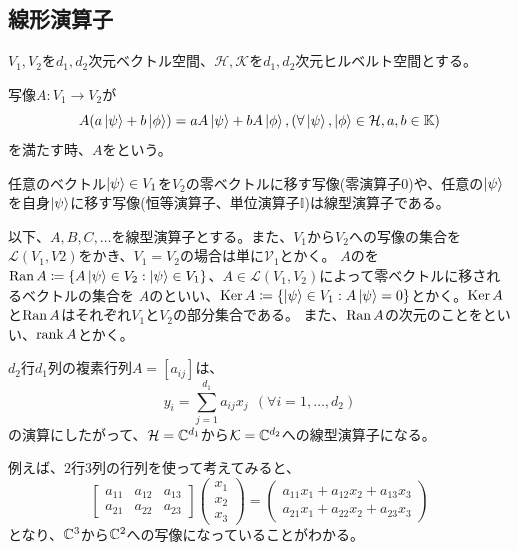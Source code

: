 \subsection{線形演算子}
$V_1,V_2$を$d_1,d_2$次元ベクトル空間、$\mathcal{H},\mathcal{K}$を$d_1,d_2$次元ヒルベルト空間とする。

\begin{Def}
  写像$A:V_1\to V_2$が
  $$
    A(a\ket{\psi} + b\ket{\phi}) = aA\ket{\psi} + bA\ket{\phi}, (\forall \ket{\psi},\ket{\phi}\in \mathcal{H},a,b \in \mathbb{K})
  $$
  を満たす時、$A$をという。
\end{Def}

任意のベクトル$\ket{\psi}\in V_1$を$V_2$の零ベクトルに移す写像(零演算子$0$)や、任意の$\ket{\psi}$を自身$\ket{\psi}$に移す写像(恒等演算子、単位演算子$\mathbb{I}$)は線型演算子である。

以下、$A,B,C,\ldots$を線型演算子とする。また、$V_1$から$V_2$への写像の集合を$\mathcal{L}(V_1,V2)$をかき、$V_1 = V_2$の場合は単に$\mathcal{V}_1$とかく。
$A$のを$\text{Ran}\,A\coloneqq\{A\ket{\psi}\in V_2 : \ket{\psi}\in V_1 \}$、$A\in \mathcal{L}(V_1,V_2)$によって零ベクトルに移されるベクトルの集合を
$A$のといい、$\text{Ker}\,A\coloneqq\{ \ket{\psi} \in V_1 : A\ket{\psi} = 0 \}$とかく。$\text{Ker}\,A$と$\text{Ran}\,A$はそれぞれ$V_1$と$V_2$の部分集合である。
また、$\text{Ran}\,A$の次元のことをといい、$\text{rank}\,A$とかく。

\begin{reidai}
  $d_2$行$d_1$列の複素行列$A = [a_{ij}]$は、
  $$
  y_i = \sum_{j=1}^{d_1} a_{ij}x_j~~(\forall i = 1,\ldots,d_2)
  $$
  の演算にしたがって、$\mathcal{H}=\mathbb{C}^{d_1}$から$\mathcal{K}=\mathbb{C}^{d_2}$への線型演算子になる。
\end{reidai}

\begin{reidai}
  例えば、$2$行$3$列の行列を使って考えてみると、
  $$
  \begin{bmatrix}
    a_{11} & a_{12} & a_{13} \\
    a_{21} & a_{22} & a_{23}
  \end{bmatrix}
  \left(
  \begin{array}{c}
    x_1\\
    x_2 \\
    x_3
  \end{array}
  \right)
    =
  \left(\begin{array}{c}
    a_{11}x_1 + a_{12}x_2 + a_{13}x_3\\
    a_{21}x_1 + a_{22}x_2 + a_{23}x_3
  \end{array}\right)
  $$
  となり、$\mathbb{C}^3$から$\mathbb{C}^2$への写像になっていることがわかる。
\end{reidai}

